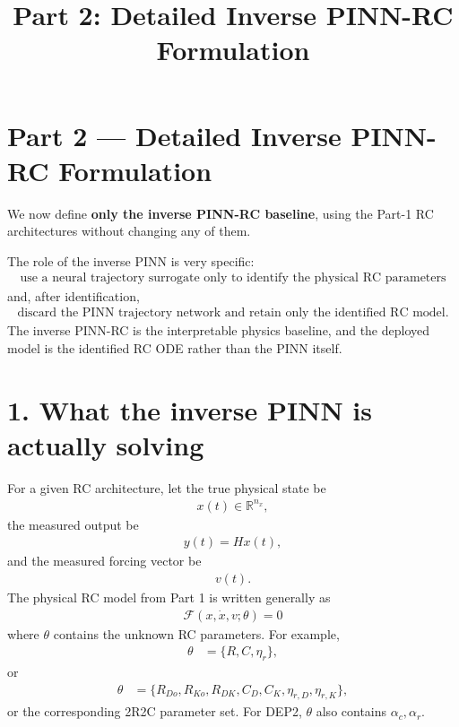 \documentclass[11pt]{article}
\title{Part 2: Detailed Inverse PINN-RC Formulation}
\author{}
\date{}
\begin{document}
\maketitle

\section*{Part 2 --- Detailed Inverse PINN-RC Formulation}

We now define \textbf{only the inverse PINN-RC baseline}, using the Part-1 RC architectures without changing any of them.

The role of the inverse PINN is very specific:
\begin{align}
\boxed{\text{use a neural trajectory surrogate only to identify the physical RC parameters}}
\end{align}
and, after identification,
\begin{align}
\boxed{\text{discard the PINN trajectory network and retain only the identified RC model.}}
\end{align}
The inverse PINN-RC is the interpretable physics baseline, and the deployed model is the identified RC ODE rather than the PINN itself.

\section*{1. What the inverse PINN is actually solving}
For a given RC architecture, let the true physical state be
\begin{align}
x(t)\in\mathbb R^{n_x},
\end{align}
the measured output be
\begin{align}
y(t)=Hx(t),
\end{align}
and the measured forcing vector be
\begin{align}
v(t).
\end{align}
The physical RC model from Part 1 is written generally as
\begin{align}
\boxed{\mathcal F\left(x,\dot x,v;\theta\right)=0}
\tag{P2.1}
\end{align}
where \(\theta\) contains the unknown RC parameters. For example,
\begin{align}
\theta&=\{R,C,\eta_r\},
\end{align}
or
\begin{align}
\theta&=\{R_{Do},R_{Ko},R_{DK},C_D,C_K,\eta_{r,D},\eta_{r,K}\},
\end{align}
or the corresponding 2R2C parameter set. For DEP2, \(\theta\) also contains \(\alpha_c,\alpha_r\).
\end{document}

